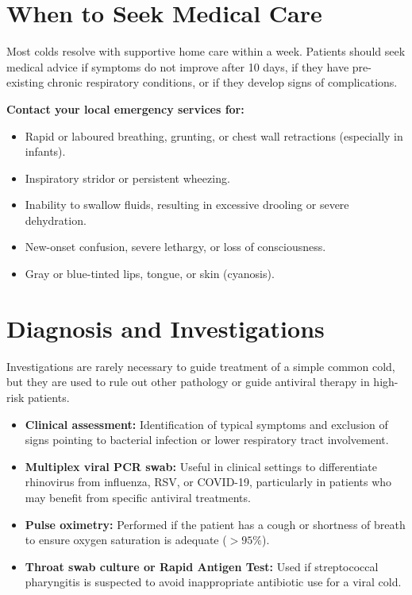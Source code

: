 \section*{When to Seek Medical Care}
Most colds resolve with supportive home care within a week. Patients should seek medical advice if symptoms do not improve after 10 days, if they have pre-existing chronic respiratory conditions, or if they develop signs of complications.

\textbf{Contact your local emergency services for:}
\begin{itemize}
    \item Rapid or laboured breathing, grunting, or chest wall retractions (especially in infants).
    \item Inspiratory stridor or persistent wheezing.
    \item Inability to swallow fluids, resulting in excessive drooling or severe dehydration.
    \item New-onset confusion, severe lethargy, or loss of consciousness.
    \item Gray or blue-tinted lips, tongue, or skin (cyanosis).
\end{itemize}

\section*{Diagnosis and Investigations}
Investigations are rarely necessary to guide treatment of a simple common cold, but they are used to rule out other pathology or guide antiviral therapy in high-risk patients.
\begin{itemize}
    \item \textbf{Clinical assessment:} Identification of typical symptoms and exclusion of signs pointing to bacterial infection or lower respiratory tract involvement.
    \item \textbf{Multiplex viral PCR swab:} Useful in clinical settings to differentiate rhinovirus from influenza, RSV, or COVID-19, particularly in patients who may benefit from specific antiviral treatments.
    \item \textbf{Pulse oximetry:} Performed if the patient has a cough or shortness of breath to ensure oxygen saturation is adequate ($>95\%$).
    \item \textbf{Throat swab culture or Rapid Antigen Test:} Used if streptococcal pharyngitis is suspected to avoid inappropriate antibiotic use for a viral cold.
\end{itemize}

